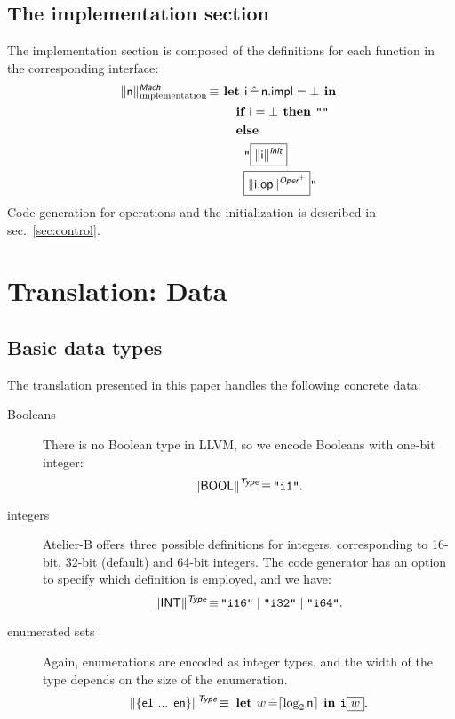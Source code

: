 \documentclass{article}
\newcommand{\trad}[2]{\ensuremath{\lVert \textsf{#1} \rVert^{\textit{#2}}}}
\DeclareMathOperator{\isdef}{\equiv}
\newcommand{\llvm}[1]{\texttt{#1}}
\newcommand{\B}[1]{\textsf{#1}}
\newcommand{\ListOf}[1]{$\mbox{#1}^+$}
\newcommand{\IF}[0]{\textbf{ if }}
\newcommand{\ELSE}[0]{\textbf{ else }}
\newcommand{\THEN}[0]{\textbf{ then }}
\newcommand{\LET}[0]{\textbf{ let }}
\DeclareMathOperator{\BE}{\hat{=}}
\newcommand{\IN}[0]{\textbf{ in }}
\newcommand{\PH}[1]{\framebox{$#1$}}
\begin{document}
\subsection{The implementation section}

The implementation section is composed of the definitions for each function
in the corresponding interface:
\begin{align*}
  \trad{\B{n}}{\B{Mach}}_{\text{implementation}} \isdef
  & \LET \B{i} \BE \B{n.impl} = \bot \IN\\
  & \quad \IF \B{i} = \bot \THEN \llvm{""} \\
  & \quad \ELSE \\
  & \quad \quad \llvm{"\PH{\trad{\B{i}}{\B{init}}}} \\
  & \quad \quad \llvm{\PH{\trad{\B{i.op}}{\ListOf{\B{Oper}}}}"}
\end{align*}
Code generation for operations and the initialization is described in
sec.~\ref{sec:control}.

\section{Translation: Data}
\label{sec:data}

\subsection{Basic data types}

The translation presented in this paper handles the following concrete data:
\begin{description}
\item[Booleans] There is no Boolean type in LLVM, so we encode Booleans with
  one-bit integer:
$$\trad{BOOL}{\B{Type}} \isdef \llvm{"i1"}.$$
\item[integers] Atelier-B offers three possible definitions for integers,
  corresponding to 16-bit, 32-bit (default) and 64-bit integers. The code
  generator has an option to specify which definition is employed, and we have:
$$\trad{INT}{\B{Type}} \isdef \llvm{"i16"} \mid \llvm{"i32"} \mid \llvm{"i64"}.$$
\item[enumerated sets] Again, enumerations are encoded as integer types, and the
  width of the type depends on the size of the enumeration.
$$\trad{\{e1 ... en\}}{\B{Type}} \isdef \LET w \BE \lceil \log_2 \B{n} \rceil \IN \llvm{i\PH{w}}.$$

\end{description}
\end{document}
